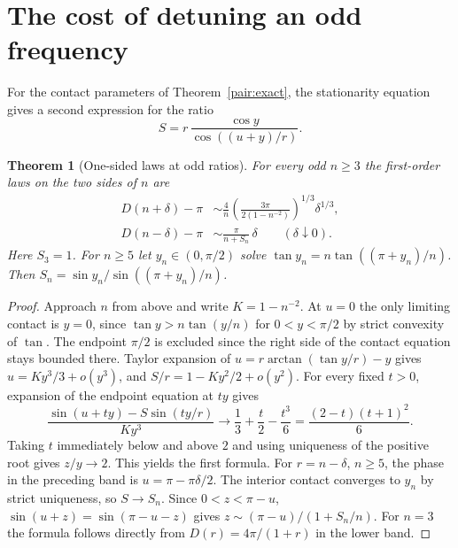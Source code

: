\documentclass[11pt,letterpaper]{article}
\newtheorem{theorem}{Theorem}[section]
\theoremstyle{remark}\newtheorem{remark}[theorem]{Remark}
\begin{document}
\section{The cost of detuning an odd frequency}\label{pair:detune}
For the contact parameters of Theorem~\ref{pair:exact}, the stationarity
equation gives a second expression for the ratio
\[
 S=r\,\frac{\cos y}{\cos((u+y)/r)}.
\]
\begin{theorem}[One-sided laws at odd ratios]\label{pair:cusp}
For every odd $n\ge3$ the first-order laws on the two sides of $n$ are
\begin{align}
 D(n+\delta)-\pi
 &\sim \frac{4}{n}\left(\frac{3\pi}{2(1-n^{-2})}\right)^{1/3}\delta^{1/3},
 \\
 D(n-\delta)-\pi
 &\sim \frac{\pi}{n+S_n}\,\delta
 \qquad (\delta\downarrow0).
\end{align}
Here $S_3=1$. For $n\ge5$ let $y_n\in(0,\pi/2)$ solve
$\tan y_n=n\tan((\pi+y_n)/n)$. Then
$S_n=\sin y_n/\sin((\pi+y_n)/n)$.
\end{theorem}
\begin{proof}
Approach $n$ from above and write $K=1-n^{-2}$.
At $u=0$ the only limiting contact is $y=0$,
since $\tan y>n\tan(y/n)$ for $0<y<\pi/2$
by strict convexity of $\tan$. The endpoint $\pi/2$ is excluded since
the right side of the contact equation stays bounded there.
Taylor expansion of
$u =r\arctan(\tan y/r)-y$ gives
$u=Ky^3/3+o(y^3)$, and
$S/r=1-Ky^2/2+o(y^2)$.
For every fixed $t>0$, expansion of the endpoint equation at $ty$ gives
\[
 \frac{\sin(u+ty)-S\sin(ty/r)}{Ky^3}
 \longrightarrow \frac13+\frac{t}{2}-\frac{t^3}{6}
 =\frac{(2-t)(t+1)^2}{6}.
\]
Taking $t$ immediately below and above $2$ and using uniqueness of the
positive root gives $z/y\to2$. This yields the first formula.
For $r=n-\delta$, $n\ge5$, the phase in the preceding band is
$u=\pi-\pi\delta/2$. The interior contact converges to $y_n$ by strict
uniqueness, so $S\to S_n$. Since $0<z<\pi-u$,
$\sin(u+z)=\sin(\pi-u-z)$ gives
$z\sim (\pi-u)/(1+S_n/n)$. For $n=3$ the formula follows directly
from $D(r)=4\pi/(1+r)$ in the lower band.
\end{proof}
\end{document}
